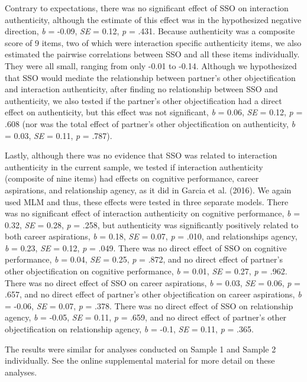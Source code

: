 \documentclass[man]{apa6}
\begin{document}
Contrary to expectations, there was no significant effect of SSO on
interaction authenticity, although the estimate of this effect was in
the hypothesized negative direction, \emph{b} = -0.09, \emph{SE} = 0.12,
\emph{p} = .431. Because authenticity was a composite score of 9 items,
two of which were interaction specific authenticity items, we also
estimated the pairwise correlations between SSO and all these items
individually. They were all small, ranging from only -0.01 to -0.14.
Although we hypothesized that SSO would mediate the relationship between
partner's other objectification and interaction authenticity, after
finding no relationship between SSO and authenticity, we also tested if
the partner's other objectification had a direct effect on authenticity,
but this effect was not significant, \emph{b} = 0.06, \emph{SE} = 0.12,
\emph{p} = .608 (nor was the total effect of partner's other
objectification on authenticity, \emph{b} = 0.03, \emph{SE} = 0.11,
\emph{p} = .787).

Lastly, although there was no evidence that SSO was related to
interaction authenticity in the current sample, we tested if interaction
authenticity (composite of nine items) had effects on cognitive
performance, career aspirations, and relationship agency, as it did in
Garcia et al. (2016). We again used MLM and thus, these effects were
tested in three separate models. There was no significant effect of
interaction authenticity on cognitive performance, \emph{b} = 0.32,
\emph{SE} = 0.28, \emph{p} = .258, but authenticity was significantly
positively related to both career aspirations, \emph{b} = 0.18,
\emph{SE} = 0.07, \emph{p} = .010, and relationships agency, \emph{b} =
0.23, \emph{SE} = 0.12, \emph{p} = .049. There was no direct effect of
SSO on cognitive performance, \emph{b} = 0.04, \emph{SE} = 0.25,
\emph{p} = .872, and no direct effect of partner's other objectification
on cognitive performance, \emph{b} = 0.01, \emph{SE} = 0.27, \emph{p} =
.962. There was no direct effect of SSO on career aspirations, \emph{b}
= 0.03, \emph{SE} = 0.06, \emph{p} = .657, and no direct effect of
partner's other objectification on career aspirations, \emph{b} = -0.06,
\emph{SE} = 0.07, \emph{p} = .378. There was no direct effect of SSO on
relationship agency, \emph{b} = -0.05, \emph{SE} = 0.11, \emph{p} =
.659, and no direct effect of partner's other objectification on
relationship agency, \emph{b} = -0.1, \emph{SE} = 0.11, \emph{p} = .365.

The results were similar for analyses conducted on Sample 1 and Sample 2
individually. See the online supplemental material for more detail on
these analyses.
\end{document}
